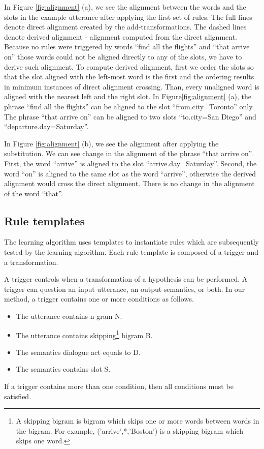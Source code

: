 \documentclass[11pt]{article}
\begin{document}
In Figure \ref{fig:alignment} (a), we see the alignment between the words and the slots in the example utterance after applying the first set of rules. The full lines denote direct alignment created by the add-transformations. The dashed lines denote derived alignment - alignment computed from the direct alignment. Because no rules were triggered by words ``find all the flights'' and ``that arrive on'' those words could not be aligned directly to any of the slots, we have to derive such alignment. To compute derived alignment, first we order the slots so that the slot aligned with the left-most word is the first and the ordering results in minimum instances of direct alignment crossing. Than, every unaligned word is aligned with the nearest left and the right slot. In Figure\ref{fig:alignment} (a), the phrase ``find all the flights'' can be aligned to the slot ``from.city=Toronto'' only. The phrase ``that arrive on'' can be aligned to two slots ``to.city=San Diego'' and ``departure.day=Saturday''.

In Figure \ref{fig:alignment} (b), we see the alignment after applying the substitution. We can see change in the alignment of the phrase ``that arrive on''. First, the word ``arrive'' is aligned to the slot ``arrive.day=Saturday''. Second, the word ``on'' is aligned to the same slot as the word ``arrive'',   otherwise the derived alignment would cross the direct alignment. There is no change in the alignment of the word ``that''.

\subsection{Rule templates}
The learning algorithm uses templates to instantiate rules which are subsequently tested by the learning algorithm. Each rule template is composed of a trigger and a transformation. 

A trigger controls when a transformation of a hypothesis can be performed. A trigger can question an input utterance, an output semantics, or both. In our method, a trigger contains one or more conditions as follows.
\begin{itemize}
  \item The utterance contains n-gram N.
  \item The utterance contains skipping\footnote{A skipping bigram is bigram which skips one or more words between words in the bigram. For example, ('arrive',*,'Boston') is a skipping bigram which skips one word.} bigram B.
  \item The semantics dialogue act equals to D.
  \item The semantics contains slot S.
\end{itemize}
If a trigger contains more than one condition, then all conditions must be satisfied. 
\end{document}
